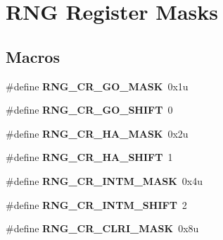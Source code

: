 \hypertarget{group___r_n_g___register___masks}{}\section{R\+N\+G Register Masks}
\label{group___r_n_g___register___masks}
\subsection*{Macros}
\begin{DoxyCompactItemize}
\item 
\hypertarget{group___r_n_g___register___masks_ga2aebfd44952b9acb9854f17cbb241dc3}{}\#define {\bfseries R\+N\+G\+\_\+\+C\+R\+\_\+\+G\+O\+\_\+\+M\+A\+S\+K}~0x1u\label{group___r_n_g___register___masks_ga2aebfd44952b9acb9854f17cbb241dc3}

\item 
\hypertarget{group___r_n_g___register___masks_ga33164b67927c62a20a5cc0ebf24a6dec}{}\#define {\bfseries R\+N\+G\+\_\+\+C\+R\+\_\+\+G\+O\+\_\+\+S\+H\+I\+F\+T}~0\label{group___r_n_g___register___masks_ga33164b67927c62a20a5cc0ebf24a6dec}

\item 
\hypertarget{group___r_n_g___register___masks_ga771a9a36a3856ec15886952dd5881e67}{}\#define {\bfseries R\+N\+G\+\_\+\+C\+R\+\_\+\+H\+A\+\_\+\+M\+A\+S\+K}~0x2u\label{group___r_n_g___register___masks_ga771a9a36a3856ec15886952dd5881e67}

\item 
\hypertarget{group___r_n_g___register___masks_ga003221e3c2c56d155f0144d99b9daa28}{}\#define {\bfseries R\+N\+G\+\_\+\+C\+R\+\_\+\+H\+A\+\_\+\+S\+H\+I\+F\+T}~1\label{group___r_n_g___register___masks_ga003221e3c2c56d155f0144d99b9daa28}

\item 
\hypertarget{group___r_n_g___register___masks_gaeb6ea10a08f7c854d7a2d566afbc509a}{}\#define {\bfseries R\+N\+G\+\_\+\+C\+R\+\_\+\+I\+N\+T\+M\+\_\+\+M\+A\+S\+K}~0x4u\label{group___r_n_g___register___masks_gaeb6ea10a08f7c854d7a2d566afbc509a}

\item 
\hypertarget{group___r_n_g___register___masks_ga3e492e16a9a75e903cc108e526b51d7f}{}\#define {\bfseries R\+N\+G\+\_\+\+C\+R\+\_\+\+I\+N\+T\+M\+\_\+\+S\+H\+I\+F\+T}~2\label{group___r_n_g___register___masks_ga3e492e16a9a75e903cc108e526b51d7f}

\item 
\hypertarget{group___r_n_g___register___masks_gabe50fd44817cb9fbdf15fc9f832bfafa}{}\#define {\bfseries R\+N\+G\+\_\+\+C\+R\+\_\+\+C\+L\+R\+I\+\_\+\+M\+A\+S\+K}~0x8u\label{group___r_n_g___register___masks_gabe50fd44817cb9fbdf15fc9f832bfafa}


\end{DoxyCompactItemize}
